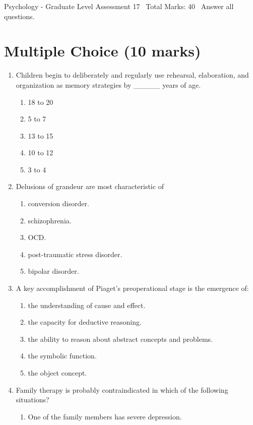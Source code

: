 \documentclass[12pt]{article}
\begin{document}
\begin{center}
Psychology - Graduate Level Assessment 17 \
Total Marks: 40 \
Answer all questions.
\end{center}

\section*{Multiple Choice (10 marks)}
\begin{enumerate}[label=\arabic*.]
\item Children begin to deliberately and regularly use rehearsal, elaboration, and organization as memory strategies by \_\_\_\_\_ years of age.
\begin{enumerate}[label=(\alph*)]
    \item 18 to 20
    \item 5 to 7
    \item 13 to 15
    \item 10 to 12
    \item 3 to 4
\end{enumerate}
\item Delusions of grandeur are most characteristic of
\begin{enumerate}[label=(\alph*)]
    \item conversion disorder.
    \item schizophrenia.
    \item OCD.
    \item post-traumatic stress disorder.
    \item bipolar disorder.
\end{enumerate}
\item A key accomplishment of Piaget's preoperational stage is the emergence of:
\begin{enumerate}[label=(\alph*)]
    \item the understanding of cause and effect.
    \item the capacity for deductive reasoning.
    \item the ability to reason about abstract concepts and problems.
    \item the symbolic function.
    \item the object concept.
\end{enumerate}
\item Family therapy is probably contraindicated in which of the following situations?
\begin{enumerate}[label=(\alph*)]
    \item One of the family members has severe depression.

\end{enumerate}
\end{enumerate}
\end{document}

